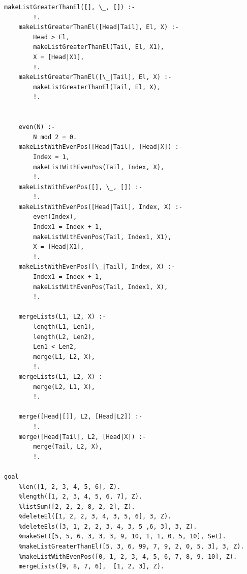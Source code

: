 \begin{lstlisting}[style=lispStyle, caption={ Правила, описывающие работу над списками},
                    label={lst:lists}]
    makeListGreaterThanEl([], \_, []) :-
        !.
    makeListGreaterThanEl([Head|Tail], El, X) :-
        Head > El,
        makeListGreaterThanEl(Tail, El, X1),
        X = [Head|X1],
        !.
    makeListGreaterThanEl([\_|Tail], El, X) :-
        makeListGreaterThanEl(Tail, El, X),
        !.


    even(N) :-
        N mod 2 = 0.
    makeListWithEvenPos([Head|Tail], [Head|X]) :-
        Index = 1,
        makeListWithEvenPos(Tail, Index, X),
        !.
    makeListWithEvenPos([], \_, []) :-
        !.
    makeListWithEvenPos([Head|Tail], Index, X) :-
        even(Index),
        Index1 = Index + 1,
        makeListWithEvenPos(Tail, Index1, X1),
        X = [Head|X1],
        !.
    makeListWithEvenPos([\_|Tail], Index, X) :-
        Index1 = Index + 1,
        makeListWithEvenPos(Tail, Index1, X),
        !.

    mergeLists(L1, L2, X) :-
        length(L1, Len1),
        length(L2, Len2),
        Len1 < Len2,
        merge(L1, L2, X),
        !.
    mergeLists(L1, L2, X) :-
        merge(L2, L1, X),
        !.

    merge([Head|[]], L2, [Head|L2]) :-
        !.
    merge([Head|Tail], L2, [Head|X]) :-
        merge(Tail, L2, X),
        !.

goal
    %len([1, 2, 3, 4, 5, 6], Z).
    %length([1, 2, 3, 4, 5, 6, 7], Z).
    %listSum([2, 2, 2, 8, 2, 2], Z).
    %deleteEl([1, 2, 2, 3, 4, 3, 5, 6], 3, Z).
    %deleteEls([3, 1, 2, 2, 3, 4, 3, 5 ,6, 3], 3, Z).
    %makeSet([5, 5, 6, 3, 3, 3, 9, 10, 1, 1, 0, 5, 10], Set).
    %makeListGreaterThanEl([5, 3, 6, 99, 7, 9, 2, 0, 5, 3], 3, Z).
    %makeListWithEvenPos([0, 1, 2, 3, 4, 5, 6, 7, 8, 9, 10], Z).
    mergeLists([9, 8, 7, 6],  [1, 2, 3], Z).

\end{lstlisting}
